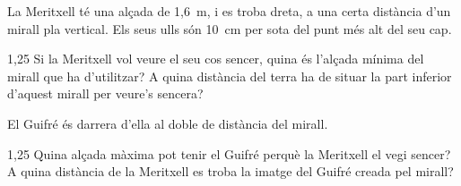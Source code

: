 La Meritxell té una alçada de 1,6~m, i es troba dreta, a una certa distància d'un mirall pla vertical. Els seus ulls són 10~cm per sota del punt més alt del seu cap.

\begin{apartat}{1,25}
Si la Meritxell vol veure el seu cos sencer, quina és l'alçada mínima del mirall que ha d'utilitzar? A quina distància del terra ha de situar la part inferior d'aquest mirall per veure's sencera?
\end{apartat}

El Guifré és darrera d'ella al doble de distància del mirall.

\begin{apartat}{1,25}
Quina alçada màxima pot tenir el Guifré perquè la Meritxell el vegi sencer? A quina distància de la Meritxell es troba la imatge del Guifré creada pel mirall?
\end{apartat}
